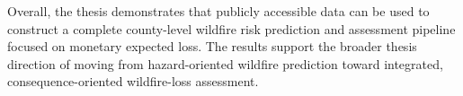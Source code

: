 Overall, the thesis demonstrates that publicly accessible data can be used to construct a complete county-level wildfire risk prediction and assessment pipeline focused on monetary expected loss. The results support the broader thesis direction of moving from hazard-oriented wildfire prediction toward integrated, consequence-oriented wildfire-loss assessment.